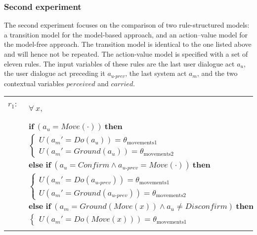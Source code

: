 \subsubsection*{Second experiment}

The second experiment focuses on the comparison of two rule-structured models: a transition model for the model-based approach, and an action--value model for the model-free approach. The transition model is identical to the one listed above and will hence not be repeated.  The action-value model is specified with a set of eleven rules.  The input variables of these rules are the last user dialogue act $a_u$, the user dialogue act preceding it $a_{u\mbox{-}prev}$, the last system act $a_m$, and the two contextual variables $\mathit{perceived}$ and $\mathit{carried}$. 

\begin{footnotesize}
\begin{longtable}{p{1cm}p{14cm}}
$r_{1}$: \ \ & $\forall \ x, $ \\ & $ \textbf{if} \ (\mathit{a_u}\!=\!\mathit{Move(\cdot)}) \ \textbf{then} $ \\
 & \;\;\;\;\; $ \begin{cases}U(\mathit{a_m}'\!=\!\mathit{Do({a_u})})\!=\!\theta_{\mathrm{movements1}} \\
U(\mathit{a_m}'\!=\!\mathit{Ground({a_u})})\!=\!\theta_{\mathrm{movements2}} \end{cases}$ \vspace{1mm} \\ & $ \textbf{else if} \ (\mathit{a_u}\!=\!\mathit{Confirm} \land \mathit{a_{u\mbox{-}prev}}\!=\!\mathit{Move(\cdot)}) \ \textbf{then}$ \\
& \;\;\;\;\; $ \begin{cases}U(\mathit{a_m}'\!=\!\mathit{Do({a_{u\mbox{-}prev}})})\!=\!\theta_{\mathrm{movements1}} \\
U(\mathit{a_m}'\!=\!\mathit{Ground({a_{u\mbox{-}prev}})})\!=\!\theta_{\mathrm{movements2}} \end{cases}$ \vspace{1mm} \\ & $ \textbf{else if} \ (\mathit{a_m}\!=\!\mathit{Ground(Move({x}))} \land \mathit{a_u}\!\neq\!\mathit{Disconfirm}) \ \textbf{then}$ \\
& \;\;\;\;\; $ \begin{cases}U(\mathit{a_m}'\!=\!\mathit{Do(Move({x}))})\!=\!\theta_{\mathrm{movements1}} \end{cases}$ \\ \\[-1mm]

\end{longtable}
\end{footnotesize}
